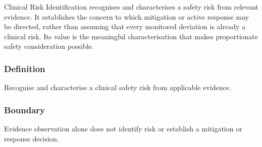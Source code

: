 Clinical Risk Identification recognises and characterises a safety risk from relevant evidence. It establishes the concern to which mitigation or active response may be directed, rather than assuming that every monitored deviation is already a clinical risk. Its value is the meaningful characterisation that makes proportionate safety consideration possible.

\subsubsection*{Definition}

Recognise and characterise a clinical safety risk from applicable evidence.

\subsubsection*{Boundary}

Evidence observation alone does not identify risk or establish a mitigation or response decision.


